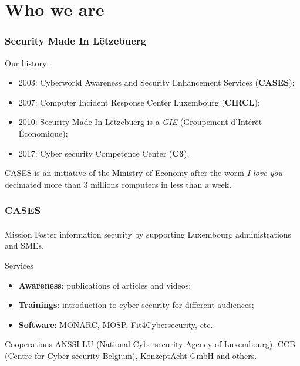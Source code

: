 %
%
\section*{Who we are}
\begin{frame}
  \frametitle{Security Made In Lëtzebuerg}
  Our history:
  \begin{center}
    \begin{itemize}
      \item 2003: Cyberworld Awareness and Security Enhancement Services (\textbf{CASES});
      \item 2007: Computer Incident Response Center Luxembourg (\textbf{CIRCL});
      \item 2010: Security Made In Lëtzebuerg is a \textit{GIE} (Groupement d’Intérêt Économique);
      \item 2017: Cyber security Competence Center (\textbf{C3}).
    \end{itemize}
  \end{center}
  CASES is an initiative of the Ministry of Economy after the worm
  \textit{I love you} decimated more than 3 millions computers in less than a week.
\end{frame}

\begin{frame}
  \frametitle{CASES}
  \framesubtitle{}
  \begin{block}{Mission}
    Foster information security by supporting Luxembourg administrations and SMEs.
  \end{block}

  \begin{block}{Services}
    \begin{center}
      \begin{itemize}
        \item \textbf{Awareness}: publications of articles and videos;
        \item \textbf{Trainings}:
        introduction to cyber security for different audiences;
        \item \textbf{Software}:
        MONARC, MOSP, Fit4Cybersecurity, etc.
      \end{itemize}
    \end{center}
  \end{block}

  \begin{block}{Cooperations}
    ANSSI-LU (National Cybersecurity Agency of Luxembourg),
    CCB (Centre for Cyber security Belgium), KonzeptAcht GmbH and others.
  \end{block}
\end{frame}

